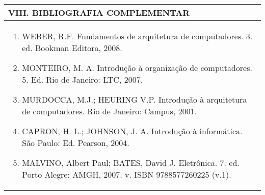 \documentclass[12pt]{article}
\begin{document}

\begin{longtable}{|L{1.025\textwidth}|} \hline
%
{\bf VIII. BIBLIOGRAFIA COMPLEMENTAR} \\ \hline
\begin{enumerate}

\item WEBER, R.F. Fundamentos de arquitetura de computadores. 3. ed. Bookman Editora, 2008.
\item MONTEIRO, M. A. Introdução à organização de computadores. 5. Ed. Rio de Janeiro: LTC, 2007. 
\item MURDOCCA, M.J.; HEURING V.P. Introdução à arquitetura de computadores. Rio de Janeiro: Campus, 2001. 
\item CAPRON, H. L.; JOHNSON, J. A. Introdução à informática. São Paulo: Ed. Pearson, 2004. 
\item MALVINO, Albert Paul; BATES, David J. Eletrônica. 7. ed. Porto Alegre: AMGH, 2007. v. ISBN 9788577260225 (v.1).

%
\end{enumerate}
 \\ \hline
\end{longtable}



\end{document}
